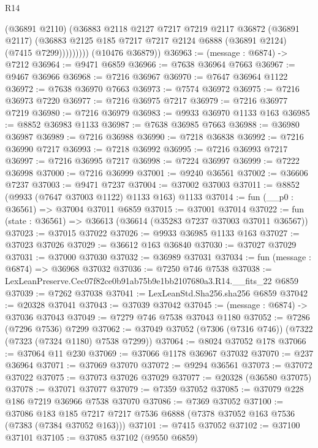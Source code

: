 \begin{lexlean}{R14}
\begin{coremodule}
                  (@36891 @2110)
                  (@36883
                    @2118
                    @2127
                    @7217
                    @7219
                    @2117
                    @36872
                    (@36891 @2117)
                    (@36883 @2125 @185 @7217 @7217 @2124 @6888 (@36891 @2124) (@7415 @7299)))))))))
      (@10476 @36879))
@36963 := (message : @6874) -> @7212
@36964 := @9471 @6859
@36966 := @7638 @36964 @7663
@36967 := @9467 @36966
@36968 := @7216 @36967
@36970 := @7647 @36964 @1122
@36972 := @7638 @36970 @7663
@36973 := @7574 @36972
@36975 := @7216 @36973 @7220
@36977 := @7216 @36975 @7217
@36979 := @7216 @36977 @7219
@36980 := @7216 @36979
@36983 := @9933 @36970 @1133 @163
@36985 := @8852 @36983 @1133
@36987 := @7638 @36985 @7663
@36988 := @36980 @36987
@36989 := @7216 @36988
@36990 := @7218 @36838
@36992 := @7216 @36990 @7217
@36993 := @7218 @36992
@36995 := @7216 @36993 @7217
@36997 := @7216 @36995 @7217
@36998 := @7224 @36997
@36999 := @7222 @36998
@37000 := @7216 @36999
@37001 := @9240 @36561
@37002 := @36606 @7237
@37003 := @9471 @7237
@37004 := @37002 @37003
@37011 := @8852 (@9933 (@7647 @37003 @1122) @1133 @163) @1133
@37014 := fun (__p0 : @36561) => @37004 @37011 @6859
@37015 := @37001 @37014
@37022 := fun (state : @36561) => @36613 (@36614 (@35283 @7237 @37003 @37011 @36567))
@37023 := @37015 @37022
@37026 := @9933 @36985 @1133 @163
@37027 := @37023 @37026
@37029 := @36612 @163 @36840
@37030 := @37027 @37029
@37031 := @37000 @37030
@37032 := @36989 @37031
@37034 := fun (message : @6874) => @36968 @37032
@37036 := @7250 @746 @7538
@37038 := LexLeanPreserve.Cec07f82ce0b91ab75b9e1bb2107680a3.R14.__fits_22 @6859
@37039 := @7262 @37038
@37041 := LexLeanStd.Sha256.sha256 @6859
@37042 := @20328 @37041
@37043 := @37039 @37042
@37045 := (message : @6874) -> @37036 @37043
@37049 := @7279 @746 @7538 @37043 @1180
@37052 := @7286 (@7296 @7536) @7299
@37062 := @37049 @37052 (@7306 (@7316 @746)) (@7322 (@7323 (@7324 @1180) @7538 @7299))
@37064 := @8024 @37052 @178
@37066 := @37064 @11 @230
@37069 := @37066 @1178 @36967 @37032
@37070 := @237 @36964
@37071 := @37069 @37070
@37072 := @9294 @36561
@37073 := @37072 @37022
@37075 := @37073 @37026 @37029
@37077 := @20328 (@36580 @37075)
@37078 := @37071 @37077
@37079 := @7359 @37052
@37085 := @37079 @228 @186 @7219 @36966 @7538 @37070
@37086 := @7369 @37052
@37100 := @37086
    @183
    @185
    @7217
    @7217
    @7536
    @6888
    (@7378 @37052 @163 @7536 (@7383 (@7384 @37052 @163)))
@37101 := @7415 @37052
@37102 := @37100 @37101
@37105 := @37085 @37102 (@9550 @6859)

\end{coremodule}
\end{lexlean}
